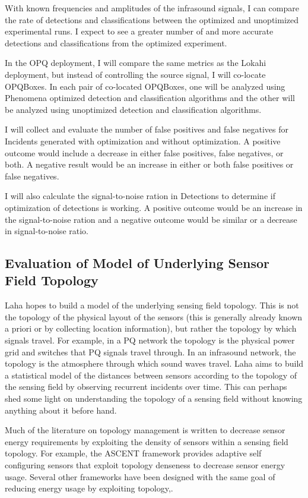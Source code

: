 With known frequencies and amplitudes of the infrasound signals, I can compare the rate of detections and classifications between the optimized and unoptimized experimental runs. I expect to see a greater number of and more accurate detections and classifications from the optimized experiment.

In the OPQ deployment, I will compare the same metrics as the Lokahi deployment, but instead of controlling the source signal, I will co-locate OPQBoxes. In each pair of co-located OPQBoxes, one will be analyzed using Phenomena optimized detection and classification algorithms and the other will be analyzed using unoptimized detection and classification algorithms.

I will collect and evaluate the number of false positives and false negatives for Incidents generated with optimization and without optimization. A positive outcome would include a decrease in either false positives, false negatives, or both. A negative result would be an increase in either or both false positives or false negatives.

I will also calculate the signal-to-noise ration in Detections to determine if optimization of detections is working. A positive outcome would be an increase in the signal-to-noise ration and a negative outcome would be similar or a decrease in signal-to-noise ratio.

\subsection{Evaluation of Model of Underlying Sensor Field Topology}
Laha hopes to build a model of the underlying sensing field topology. This is not the topology of the physical layout of the sensors (this is generally already known a priori or by collecting location information), but rather the topology by which signals travel. For example, in a PQ network the topology is the physical power grid and switches that PQ signals travel through. In an infrasound network, the topology is the atmosphere through which sound waves travel. Laha aims to build a statistical model of the distances between sensors according to the topology of the sensing field by observing recurrent incidents over time. This can perhaps shed some light on understanding the topology of a sensing field without knowing anything about it before hand.

Much of the literature on topology management is written to decrease sensor energy requirements by exploiting the density of sensors within a sensing field topology. For example, the ASCENT\cite{cerpa2004ascent} framework provides adaptive self configuring sensors that exploit topology denseness to decrease sensor energy usage. Several other frameworks have been designed with the same goal of reducing energy usage by exploiting topology\cite{schurgers2002stem},\cite{schurgers2002topology}.


